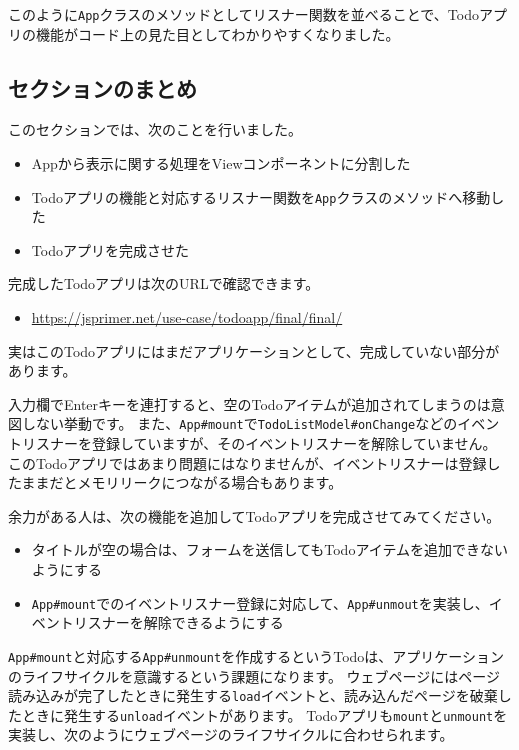 このように\texttt{App}クラスのメソッドとしてリスナー関数を並べることで、Todoアプリの機能がコード上の見た目としてわかりやすくなりました。

\hypertarget{section-conclusion}{%
\subsection{セクションのまとめ}\label{section-conclusion}}

このセクションでは、次のことを行いました。

\begin{itemize}
\item
  Appから表示に関する処理をViewコンポーネントに分割した
\item
  Todoアプリの機能と対応するリスナー関数を\texttt{App}クラスのメソッドへ移動した
\item
  Todoアプリを完成させた
\end{itemize}

完成したTodoアプリは次のURLで確認できます。

\begin{itemize}
\item
  \url{https://jsprimer.net/use-case/todoapp/final/final/}
\end{itemize}

実はこのTodoアプリにはまだアプリケーションとして、完成していない部分があります。

入力欄でEnterキーを連打すると、空のTodoアイテムが追加されてしまうのは意図しない挙動です。
また、\texttt{App\#mount}で\texttt{TodoListModel\#onChange}などのイベントリスナーを登録していますが、そのイベントリスナーを解除していません。
このTodoアプリではあまり問題にはなりませんが、イベントリスナーは登録したままだとメモリリークにつながる場合もあります。

余力がある人は、次の機能を追加してTodoアプリを完成させてみてください。

\begin{itemize}
\item
  タイトルが空の場合は、フォームを送信してもTodoアイテムを追加できないようにする
\item
  \texttt{App\#mount}でのイベントリスナー登録に対応して、\texttt{App\#unmout}を実装し、イベントリスナーを解除できるようにする
\end{itemize}

\texttt{App\#mount}と対応する\texttt{App\#unmount}を作成するというTodoは、アプリケーションのライフサイクルを意識するという課題になります。
ウェブページにはページ読み込みが完了したときに発生する\texttt{load}イベントと、読み込んだページを破棄したときに発生する\texttt{unload}イベントがあります。
Todoアプリも\texttt{mount}と\texttt{unmount}を実装し、次のようにウェブページのライフサイクルに合わせられます。

